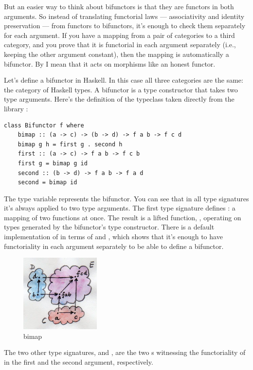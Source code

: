 But an easier way to think about bifunctors is that they are functors in
both arguments. So instead of translating functorial laws ---
associativity and identity preservation --- from functors to bifunctors,
it's enough to check them separately for each argument. If you have a
mapping from a pair of categories to a third category, and you prove
that it is functorial in each argument separately (i.e., keeping the
other argument constant), then the mapping is automatically a bifunctor.
By  I mean that it acts on morphisms like an honest
functor.

Let's define a bifunctor in Haskell. In this case all three categories
are the same: the category of Haskell types. A bifunctor is a type
constructor that takes two type arguments. Here's the definition of the
 typeclass taken directly from the library
:

\begin{Verbatim}
class Bifunctor f where 
    bimap :: (a -> c) -> (b -> d) -> f a b -> f c d
    bimap g h = first g . second h
    first :: (a -> c) -> f a b -> f c b
    first g = bimap g id
    second :: (b -> d) -> f a b -> f a d
    second = bimap id
\end{Verbatim}
The type variable  represents the bifunctor. You can see that
in all type signatures it's always applied to two type arguments. The
first type signature defines : a mapping of two functions
at once. The result is a lifted function,
, operating on types
generated by the bifunctor's type constructor. There is a default
implementation of  in terms of  and
, which shows that it's enough to have functoriality in
each argument separately to be able to define a bifunctor.

\begin{figure}[H]
\centering
\includegraphics[width=40mm]{images/bimap.jpg}
\caption{bimap}
\end{figure}

\noindent
The two other type signatures,  and , are
the two s witnessing the functoriality of  in the
first and the second argument, respectively.

